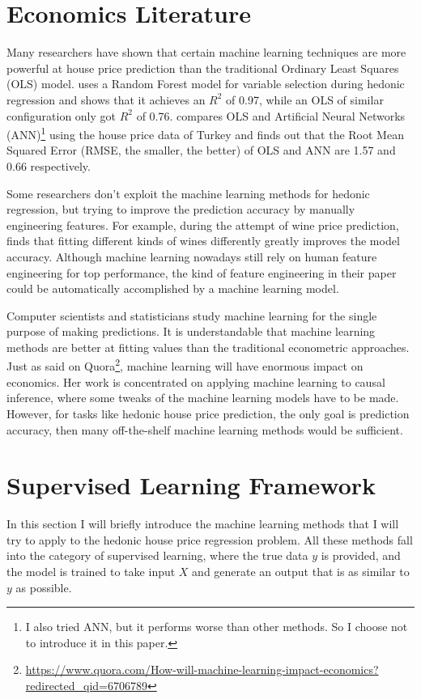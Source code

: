 \documentclass[a4paper]{article}
\begin{document}
\section{Economics Literature}
Many researchers have shown that certain machine learning techniques are more powerful at house price prediction than the traditional Ordinary Least Squares (OLS) model. \cite{yoo2012variable} uses a Random Forest model for variable selection during hedonic regression and shows that it achieves an $R^2$ of 0.97, while an OLS of similar configuration only got $R^2$ of 0.76.
\cite{Selim20092843} compares OLS and Artificial Neural Networks (ANN)\footnote{I also tried ANN, but it performs worse than other methods. So I choose not to introduce it in this paper.} using the house price data of Turkey and finds out that the Root Mean Squared Error (RMSE, the smaller, the better) of OLS and ANN are 1.57 and 0.66 respectively.

Some researchers don't exploit the machine learning methods for hedonic regression, but trying to improve the prediction accuracy by manually engineering features. For example, during the attempt of wine price prediction, \cite{costanigro2007segmenting} finds that fitting different kinds of wines differently greatly improves the model accuracy. Although machine learning nowadays still rely on human feature engineering for top performance, the kind of feature engineering in their paper could be automatically accomplished by a machine learning model.

Computer scientists and statisticians study machine learning for the single purpose of making predictions. It is understandable that machine learning methods are better at fitting values than the traditional econometric approaches. Just as \cite{AtheyQuora} said on Quora\footnote{\url{https://www.quora.com/How-will-machine-learning-impact-economics?redirected_qid=6706789}}, machine learning will have enormous impact on economics. Her work is concentrated on applying machine learning to causal inference, where some tweaks of the machine learning models have to be made. However, for tasks like hedonic house price prediction, the only goal is prediction accuracy, then many off-the-shelf machine learning methods would be sufficient.

\section{Supervised Learning Framework}
In this section I will briefly introduce the machine learning methods that I will try to apply to the hedonic house price regression problem. All these methods fall into the category of supervised learning, where the true data $y$ is provided, and the model is trained to take input $X$ and generate an output that is as similar to $y$ as possible. 
\end{document}
